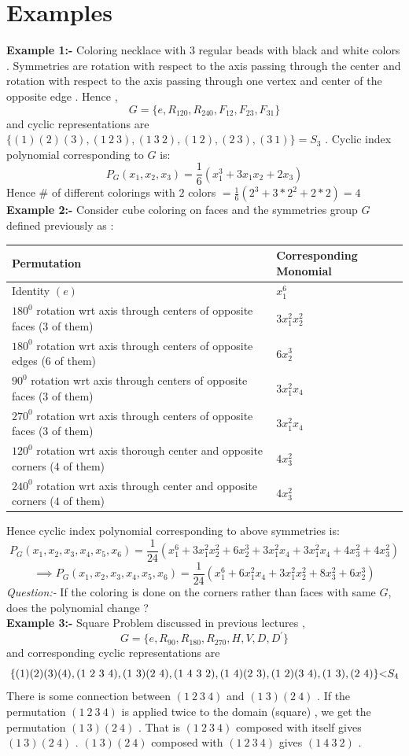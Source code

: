 \section{Examples}
\textbf{Example 1:-} Coloring necklace with 3 regular beads with black and white colors . Symmetries are rotation with respect to the axis passing through the center and rotation with respect to the axis passing through one vertex and center of the opposite edge . Hence ,   $$G=\{e,R_{120},R_{240},F_{12},F_{23},F_{31}\}$$ and cyclic representations are $\{(1)(2)(3),(1~2~3),(1~3~2),(1~2),(2~3),(3~1)\}=S_3$ . Cyclic index polynomial corresponding to $G$ is:
$$P_G(x_1,x_2,x_3) = \frac{1}{6}\left(x_1^3+3x_1x_2+2x_3\right)$$
Hence \# of different colorings with $2$ colors $=\frac{1}{6}\left(2^3+3*2^2+2*2\right) = 4$\\
\textbf{Example 2:-} Consider cube coloring on faces and the symmetries group $G$ defined previously as :


\begin{tabular}{|l|l|}
    \hline
\textbf{Permutation} & \textbf{Corresponding Monomial} \\\hline
Identity $(e)$ & $x_1^6$\\
$180^0$ rotation wrt axis through centers of opposite faces ($3$ of them) &  $3x_1^{2}x_2^{2}$\\
$180^0$ rotation wrt axis through centers of opposite edges ($6$ of them) &  $6x_2^3$\\
$90^0$ rotation wrt axis through centers of opposite faces ($3$ of them) &  $3x_1^2x_4$\\
 $270^0$ rotation wrt axis through centers of opposite faces ($3$ of them) & $3x_1^2x_4$\\
 $120^0$ rotation wrt axis thorough center and opposite corners ($4$ of them) & $4x_3^2$ \\
 $240^0$ rotation wrt axis through center and opposite corners ($4$ of them)  &  $4x_3^2$\\ \hline
    \end{tabular}
    
    
Hence cyclic index polynomial corresponding to above symmetries is:
$$P_G(x_1,x_2,x_3,x_4,x_5,x_6)=\frac{1}{24}\left(x_1^6+3x_1^2x_2^2+6x_2^3+3x_1^2x_4+3x_1^2x_4+4x_3^2+4x_3^2\right)$$
$$\implies P_G(x_1,x_2,x_3,x_4,x_5,x_6)=\frac{1}{24}\left(x_1^6+6x_1^2x_4+3x_1^2x_2^2+8x_3^2+6x_2^3\right)$$
\textit{Question:-} If the coloring is done on the corners rather than faces with same $G$, does the polynomial change ?
\\
\textbf{Example 3:-} Square Problem discussed in previous lectures , $$G=\{e,R_{90},R_{180},R_{270},H,V,D,D^{\prime}\}$$ and corresponding cyclic representations are $$\{(1)(2)(3)(4),(1~2~3~4),(1~3)(2~4),(1~4~3~2),(1~4)(2~3),(1~2)(3~4),(1~3),(2~4)\} {\ensuremath <} S_4$$
There is some connection between $(1~2~3~4)$ and $(1~3)(2~4)$ . If the permutation $(1~2~3~4)$ is applied twice to the domain (square) , we get the permutation $(1~3)(2~4)$ . That is $(1~2~3~4)$ composed with itself gives $(1~3)(2~4)$ . $(1~3)(2~4)$ composed with $(1~2~3~4)$ gives $(1~4~3~2)$ .

